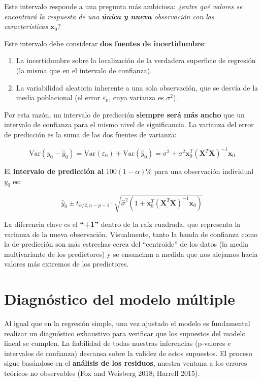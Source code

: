 \documentclass[
  letterpaper,
  DIV=11,
  numbers=noendperiod]{scrreprt}
\providecommand{\tightlist}{%
  \setlength{\itemsep}{0pt}\setlength{\parskip}{0pt}}
\begin{document}
Este intervalo responde a una pregunta más ambiciosa: \emph{¿entre qué
valores se encontrará la respuesta de una \textbf{única y nueva}
observación con las características} \(\mathbf{x}_0\)?

Este intervalo debe considerar \textbf{dos fuentes de incertidumbre}:

\begin{enumerate}
\def\labelenumi{\arabic{enumi}.}
\tightlist
\item
  La incertidumbre sobre la localización de la verdadera superficie de
  regresión (la misma que en el intervalo de confianza).
\item
  La variabilidad aleatoria inherente a una sola observación, que se
  desvía de la media poblacional (el error \(\varepsilon_0\), cuya
  varianza es \(\sigma^2\)).
\end{enumerate}

Por esta razón, un intervalo de predicción \textbf{siempre será más
ancho} que un intervalo de confianza para el mismo nivel de
significancia. La varianza del error de predicción es la suma de las dos
fuentes de varianza:

\[\text{Var}(y_0 - \hat{y}_0) = \text{Var}(\varepsilon_0) + \text{Var}(\hat{y}_0) = \sigma^2 + \sigma^2 \mathbf{x}_0^T (\mathbf{X}^T\mathbf{X})^{-1} \mathbf{x}_0\]

El \textbf{intervalo de predicción al} \(100(1-\alpha)\%\) para una
observación individual \(y_0\) es:

\[\hat{y}_0 \pm t_{\alpha/2, n-p-1} \cdot \sqrt{\hat{\sigma}^2 \left(1 + \mathbf{x}_0^T (\mathbf{X}^T\mathbf{X})^{-1} \mathbf{x}_0\right)}\]

La diferencia clave es el \textbf{``+1''} dentro de la raíz cuadrada,
que representa la varianza de la nueva observación. Visualmente, tanto
la banda de confianza como la de predicción son más estrechas cerca del
``centroide'' de los datos (la media multivariante de los predictores) y
se ensanchan a medida que nos alejamos hacia valores más extremos de los
predictores.

\section{Diagnóstico del modelo
múltiple}\label{diagnuxf3stico-del-modelo-muxfaltiple}

Al igual que en la regresión simple, una vez ajustado el modelo es
fundamental realizar un diagnóstico exhaustivo para verificar que los
supuestos del modelo lineal se cumplen. La fiabilidad de todas nuestras
inferencias (p-valores e intervalos de confianza) descansa sobre la
validez de estos supuestos. El proceso sigue basándose en el
\textbf{análisis de los residuos}, nuestra ventana a los errores
teóricos no observables (Fox and Weisberg 2018; Harrell 2015).
\end{document}
